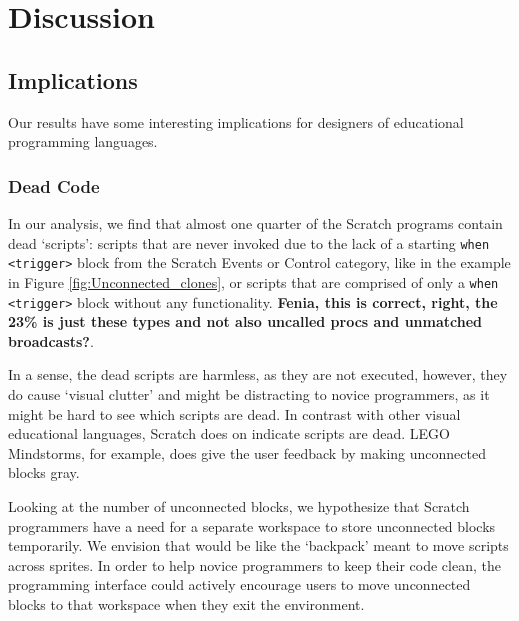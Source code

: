 \documentclass{sig-alternate}
\newcommand{\todo}[1]{\textbf{#1}}
\begin{document}
\noindent
{}


\section{Discussion}
\label{sec:discussion}
\subsection{Implications}
Our results have some interesting implications for designers of educational programming languages. 

\subsubsection{Dead Code}
In our analysis, we find that almost one quarter of the Scratch programs contain dead `scripts': scripts that are never invoked due to the lack of a starting \texttt{when <trigger>} block from the Scratch Events or Control category, like in the example in Figure \ref{fig:Unconnected_clones}, or scripts that are comprised of only a \texttt{when <trigger>} block without any functionality. \todo{Fenia, this is correct, right, the 23\% is just these types and not also uncalled procs and unmatched broadcasts?}.

In a sense, the dead scripts are harmless, as they are not executed, however, they do cause `visual clutter' and might be distracting to novice programmers, as it might be hard to see which scripts are dead. In contrast with other visual educational languages, Scratch does on indicate scripts are dead. LEGO Mindstorms, for example, does give the user feedback by making unconnected blocks gray. 

Looking at the number of unconnected blocks, we hypothesize that Scratch programmers have a need for a separate workspace to store unconnected blocks temporarily. We envision that would be like the `backpack' meant to move scripts across sprites. In order to help novice programmers to keep their code clean, the programming interface could  actively encourage users to move unconnected blocks to that workspace when they exit the environment.
\end{document}
